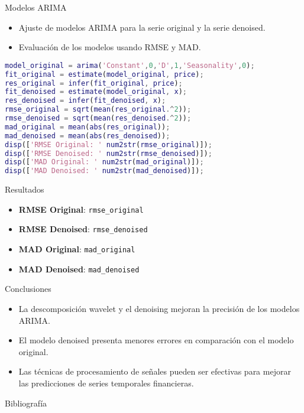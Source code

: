 \documentclass{beamer}
\begin{document}
\begin{frame}{Modelos ARIMA}
\begin{itemize}
    \item Ajuste de modelos ARIMA para la serie original y la serie denoised.
    \item Evaluación de los modelos usando RMSE y MAD.
\end{itemize}
\begin{lstlisting}[language=Matlab]
model_original = arima('Constant',0,'D',1,'Seasonality',0);
fit_original = estimate(model_original, price);
res_original = infer(fit_original, price);
fit_denoised = estimate(model_original, x);
res_denoised = infer(fit_denoised, x);
rmse_original = sqrt(mean(res_original.^2));
rmse_denoised = sqrt(mean(res_denoised.^2));
mad_original = mean(abs(res_original));
mad_denoised = mean(abs(res_denoised));
disp(['RMSE Original: ' num2str(rmse_original)]);
disp(['RMSE Denoised: ' num2str(rmse_denoised)]);
disp(['MAD Original: ' num2str(mad_original)]);
disp(['MAD Denoised: ' num2str(mad_denoised)]);
\end{lstlisting}
\end{frame}

\begin{frame}{Resultados}
\begin{itemize}
    \item \textbf{RMSE Original}: \texttt{\num{rmse_original}}
    \item \textbf{RMSE Denoised}: \texttt{\num{rmse_denoised}}
    \item \textbf{MAD Original}: \texttt{\num{mad_original}}
    \item \textbf{MAD Denoised}: \texttt{\num{mad_denoised}}
\end{itemize}
\end{frame}

\begin{frame}{Conclusiones}
\begin{itemize}
    \item La descomposición wavelet y el denoising mejoran la precisión de los modelos ARIMA.
    \item El modelo denoised presenta menores errores en comparación con el modelo original.
    \item Las técnicas de procesamiento de señales pueden ser efectivas para mejorar las predicciones de series temporales financieras.
\end{itemize}
\end{frame}

\begin{frame}{Bibliografía}
\printbibliography
\end{frame}
\end{document}
